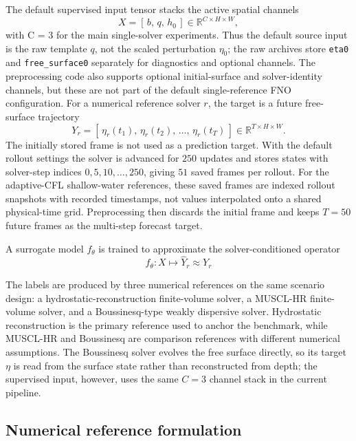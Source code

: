 The default supervised input tensor stacks the active spatial channels
\[
X = [\,b,\, q,\, h_0\,] \in\mathbb{R}^{C \times H \times W},
\]
with C = 3 for the main single-solver experiments. Thus the default source input is the raw template $q$, not the scaled perturbation $\eta_0$; the raw archives store \texttt{eta0} and \texttt{free\_surface0} separately for diagnostics and optional channels. The preprocessing code also supports optional initial-surface and solver-identity channels, but these are not part of the default single-reference FNO configuration. For a numerical reference solver $r$, the target is a future free-surface trajectory
\[
Y_r = [\,\eta_r(t_1),\, \eta_r(t_2),\, \ldots,\, \eta_r(t_T)\,] \in\mathbb{R}^{T \times H \times W}.
\]
The initially stored frame is not used as a prediction target. With the default rollout settings the solver is advanced for $250$ updates and stores states with solver-step indices $0, 5, 10, \ldots, 250$, giving $51$ saved frames per rollout. For the adaptive-CFL shallow-water references, these saved frames are indexed rollout snapshots with recorded timestamps, not values interpolated onto a shared physical-time grid. Preprocessing then discards the initial frame and keeps $T = 50$ future frames as the multi-step forecast target.

A surrogate model $f_\theta$ is trained to approximate the solver-conditioned operator
\[
f_\theta : X \mapsto \widehat{Y}_r \approx{Y_r}
\]

The labels are produced by three numerical references on the same scenario design: a hydrostatic-reconstruction finite-volume solver, a MUSCL-HR finite-volume solver, and a Boussinesq-type weakly dispersive solver. Hydrostatic reconstruction is the primary reference used to anchor the benchmark, while MUSCL-HR and Boussinesq are comparison references with different numerical assumptions. The Boussinesq solver evolves the free surface directly, so its target $\eta$ is read from the surface state rather than reconstructed from depth; the supervised input, however, uses the same $C=3$ channel stack in the current pipeline.

\subsection{Numerical reference formulation}
\label{subsec:numerical-reference-formulation}

